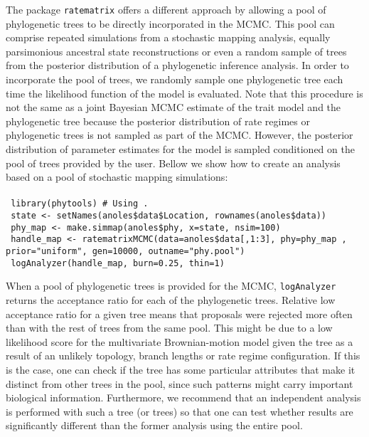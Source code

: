 The package \texttt{ratematrix} offers a different approach by allowing a pool of phylogenetic trees to be directly incorporated in the MCMC. This pool can comprise repeated simulations from a stochastic mapping analysis, equally parsimonious ancestral state reconstructions or even a random sample of trees from the posterior distribution of a phylogenetic inference analysis. In order to incorporate the pool of trees, we randomly sample one phylogenetic tree each time the likelihood function of the model is evaluated. Note that this procedure is not the same as a joint Bayesian MCMC estimate of the trait model and the phylogenetic tree because the posterior distribution of rate regimes or phylogenetic trees is not sampled as part of the MCMC. However, the posterior distribution of parameter estimates for the model is sampled conditioned on the pool of trees provided by the user. Bellow we show how to create an analysis based on a pool of stochastic mapping simulations:\\
\\
\hspace*{20pt} \texttt{ library(phytools)  \# Using \citet{revell_phytools:_2012}. } \\
\hspace*{20pt} \texttt{ state <- setNames(anoles\$data\$Location, rownames(anoles\$data)) } \\
\hspace*{20pt} \texttt{ phy\_map <- make.simmap(anoles\$phy, x=state, nsim=100) } \\
\hspace*{20pt} \texttt{ handle\_map <- ratematrixMCMC(data=anoles\$data[,1:3], phy=phy\_map \newline , prior="uniform", gen=10000, outname="phy.pool") } \\
\hspace*{20pt} \texttt{ logAnalyzer(handle\_map, burn=0.25, thin=1) }\\

\pagebreak

When a pool of phylogenetic trees is provided for the MCMC, \texttt{logAnalyzer} returns the acceptance ratio for each of the phylogenetic trees. Relative low acceptance ratio for a given tree means that proposals were rejected more often than with the rest of trees from the same pool. This might be due to a low likelihood score for the multivariate Brownian-motion model given the tree as a result of an unlikely topology, branch lengths or rate regime configuration. If this is the case, one can check if the tree has some particular attributes that make it distinct from other trees in the pool, since such patterns might carry important biological information. Furthermore, we recommend that an independent analysis is performed with such a tree (or trees) so that one can test whether results are significantly different than the former analysis using the entire pool.

